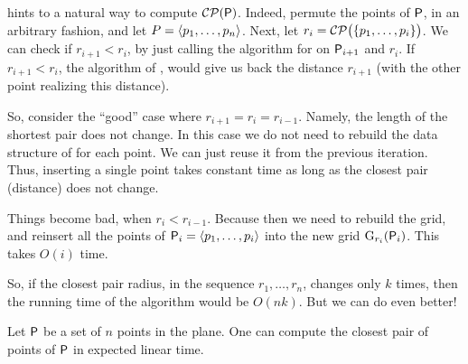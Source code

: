  hints to a natural way to compute
$\mathcal{CP}({\mathsf{P}})$.  Indeed, permute the points of ${\mathsf{P}}$, in
an arbitrary fashion, and let $P = \left\langle {p_1, \ldots, p_n} \right\rangle$. Next,
let $r_i = \ClosestPair\pth{\bigl.\brc{p_1,\ldots, p_i} }$. We can
check if $r_{i+1} < r_i$, by just calling the algorithm for
 on ${\mathsf{P}}_{i+1}$ and $r_i$. If $r_{i+1} < r_i$,
the algorithm of , would give us back the distance
$r_{i+1}$ (with the other point realizing this distance).

So, consider the ``good'' case where $r_{i+1} = r_{i}=r_{i-1}$.
Namely, the length of the shortest pair does not change. In this case
we do not need to rebuild the data structure of  for
each point. We can just reuse it from the previous iteration. Thus,
inserting a single point takes constant time as long as the closest
pair (distance) does not change.

Things become bad, when $r_{i} < r_{i-1}$. Because then we need to
rebuild the grid, and reinsert all the points of
${\mathsf{P}}_i = \left\langle {p_1,\ldots, p_i} \right\rangle$ into the new grid
$\Grid_{r_i}\pth{\PntSet_i}$.  This takes $O(i)$ time.

So, if the closest pair radius, in the sequence $r_1,\ldots, r_n$,
changes only $k$ times, then the running time of the algorithm would
be $O(nk)$. But we can do even better!

\begin{theorem}
    Let ${\mathsf{P}}$ be a set of $n$ points in the plane. One can compute
    the closest pair of points of ${\mathsf{P}}$ in expected linear time.
\end{theorem}

